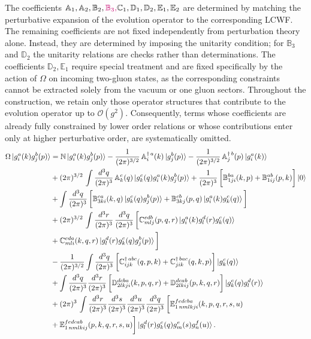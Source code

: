 \documentclass[a4paper,11pt]{article}
\def\mf#1{\mathbb{#1}}
\begin{document}
The coefficients $\mf{A}_{1}, \mf{A}_{2}, \mf{B}_{2}, {\color{chg}\mf{B}_{3},} \mf{C}_{1}, \mf{D}_{1}, \mf{D}_{2},\mf{E}_{1},\mf{E}_{2}$ are determined by matching the perturbative expansion of the evolution operator to the corresponding LCWF. The remaining coefficients are not fixed independently from perturbation theory alone. Instead, they are determined by imposing the unitarity condition{\color{chg}; for $\mf{B}_{3}$ and $\mf{D}_{2}$ the unitarity relations are checks rather than determinations}. The coefficients $\mf{D}_{2}, \mf{E}_{1}$ require special treatment and are fixed specifically by the action of $\Omega$ on incoming two-gluon states, as the corresponding constraints cannot be extracted solely from the vacuum or one gluon sectors. Throughout the construction, we retain only those operator structures that contribute to the evolution operator up to $\mathcal{O}(g^{2})$. Consequently, terms whose coefficients are already fully constrained by lower order relations or whose contributions enter only at higher perturbative order, are systematically omitted.\\
\raggedbottom
\begin{align}\label{eq:Omegaongg}
    \Omega\ket{g^{a}_{i}(k)g^{b}_{j}(p)} & = \mf{N}\ket{g^{a}_{i}(k)g^{b}_{j}(p)}
    -\frac{1}{(2\pi)^{3/2}}\, \mf{A}^{\dagger\, a}_{i}(k) \ket{g^{b}_{j}(p)} - \frac{1}{(2\pi)^{3/2}}\, \mf{A}^{\dagger\, b}_{j}(p) \ket{g^{a}_{i}(k)} \notag \\ & 
    +(2\pi)^{3/2}\,\int \frac{d^{3}q}{(2\pi)^{3}}\, \mf{A}^{c}_{k}(q)\ket{g^{c}_{k}(q)g^{a}_{i}(k)g^{b}_{j}(p)}
    + \frac{1}{(2\pi)^{3}}\, \bigg[\mf{B}^{ba}_{1ji}(k,p)+\mf{B}^{ab}_{1ij}(p,k)\bigg] \ket{0} \notag \\ & + \int \frac{d^{3}q}{(2\pi)^{3}}\, \bigg[\mf{B}^{ca}_{3ki}(k,q)\ket{g^{c}_{k}(q)g^{b}_{j}(p)}+\mf{B}^{cb}_{3kj}(p,q)\ket{g^{a}_{i}(k)g^{c}_{k}(q)}\bigg]\notag \\ &+ (2\pi)^{3/2}\, \int \frac{d^{3}r}{(2\pi)^{3}}\, \frac{d^{3}q}{(2\pi)^{3}}\, \bigg[\mf{C}^{edb}_{mlj}(p,q,r)\ket{g^{a}_{i}(k)g^{d}_{l}(r)g^{c}_{k}(q)} \notag \\ & + \mf{C}^{eda}_{mli}(k,q,r)\ket{g^{d}_{l}(r)g^{c}_{k}(q)g^{b}_{j}(p)}\bigg]\notag \\ & 
    - \frac{1}{(2\pi)^{3/2}} \int \frac{d^{3}q}{(2\pi)^{3}}\,\bigg[\mf{C}^{\dagger\, abc}_{ijk}(q,p,k)+\mf{C}^{\dagger\, bac}_{jik}(q,k,p)\bigg]\ket{g^{c}_{k}(q)}  \notag \\ & 
    +  \int \frac{d^{3}q}{(2\pi)^{3}}\frac{d^{3}r}{(2\pi)^{3}} \,\bigg[ \mf{D}^{dcba}_{2lkji}(k,p,q,r)+\mf{D}^{dcab}_{2lkij}(p,k,q,r)\bigg]\ket{g^{c}_{k}(q)g^{d}_{l}(r)}\notag \\ & 
    +   (2\pi)^{3}\, \int  \frac{d^3r}{(2\pi)^3} \frac{d^3s}{(2\pi)^3} \frac{d^3u}{(2\pi)^3} \frac{d^3q}{(2\pi)^3}\,  \bigg[\mf{E}^{fedcba}_{1\,nmlkji}(k,p,q,r,s,u)\notag \\ & +\mf{E}^{fedcab}_{1\,nmlkij}(p,k,q,r,s,u)\bigg] \ket{g^{d}_{l}(r)g^{c}_{k}(q)g^{e}_{m}(s)g^{f}_{n}(u)}.
\end{align}
\end{document}
